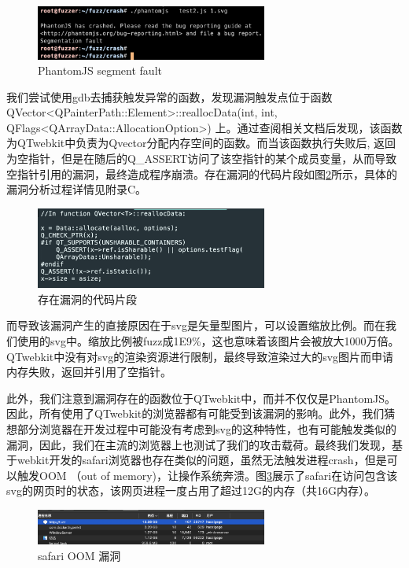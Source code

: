 \documentclass[doctor,privacy,twoside]{buaa_mac}
\begin{document}
\centerline{}
\begin{figure}[!h]
  \centering
  \includegraphics[width=0.68\textwidth]{images/seg_fault.png}
  \caption{PhantomJS segment fault}
  \label{fig:segment}
\end{figure}
\centerline{}

我们尝试使用gdb去捕获触发异常的函数，发现漏洞触发点位于函数 QVector<QPainterPath::Element>::reallocData(int, int, QFlags<QArrayData::AllocationOption>) 上。通过查阅相关文档后发现，该函数为QTwebkit中负责为Qvector分配内存空间的函数。而当该函数执行失败后, 返回为空指针，但是在随后的Q\_{}ASSERT访问了该空指针的某个成员变量，从而导致空指针引用的漏洞，最终造成程序崩溃。存在漏洞的代码片段如图\ref{fig:vuln}所示，具体的漏洞分析过程详情见附录C。


\centerline{}
\begin{figure}[!h]
  \centering
  \includegraphics[width=0.68\textwidth]{images/vuln_func.png}
  \caption{存在漏洞的代码片段}
  \label{fig:vuln}
\end{figure}
\centerline{}


而导致该漏洞产生的直接原因在于svg是矢量型图片，可以设置缩放比例。而在我们使用的svg中。缩放比例被fuzz成1E9\%，这也意味着该图片会被放大1000万倍。QTwebkit中没有对svg的渲染资源进行限制，最终导致渲染过大的svg图片而申请内存失败，返回并引用了空指针。

此外，我们注意到漏洞存在的函数位于QTwebkit中，而并不仅仅是PhantomJS。因此，所有使用了QTwebkit的浏览器都有可能受到该漏洞的影响。此外，我们猜想部分浏览器在开发过程中可能没有考虑到svg的这种特性，也有可能触发类似的漏洞，因此，我们在主流的浏览器上也测试了我们的攻击载荷。最终我们发现，基于webkit开发的safari浏览器也存在类似的问题，虽然无法触发进程crash，但是可以触发OOM （out of memory)，让操作系统奔溃。图\ref{fig:oom}展示了safari在访问包含该svg的网页时的状态，该网页进程一度占用了超过12G的内存（共16G内存）。

\centerline{}
\begin{figure}[!h]
  \centering
  \includegraphics[width=0.68\textwidth]{images/safari_oom.jpg}
  \caption{safari OOM 漏洞}
  \label{fig:oom}
\end{figure}
\centerline{}
\end{document}
